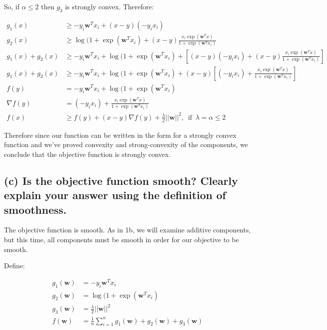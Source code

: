 \documentclass{article}
\begin{document}
So, if $\alpha \leq 2$ then $g_3$ is strongly convex.  Therefore:

\begin{equation}
\begin{aligned}
g_1(x) &\geq -y_i \mathbf{w}^T x_i + (x - y)(-y_i x_i) \\
g_2(x) &\geq \log(1 + \exp(\mathbf{w}^Tx_i) + (x - y)\frac{ x_i \exp(\mathbf{w}^Tx ) }{ 1 + \exp( \mathbf{w}^Tx_i ) } \\
g_1(x) + g_2(x) & \geq  -y_i \mathbf{w}^T x_i + \log(1 + \exp(\mathbf{w}^Tx_i) + [ (x - y)(-y_i x_i) + (x - y)\frac{ x_i \exp(\mathbf{w}^Tx ) }{ 1 + \exp( \mathbf{w}^Tx_i ) } ] \\
g_1(x) + g_2(x) & \geq  -y_i \mathbf{w}^T x_i + \log(1 + \exp(\mathbf{w}^Tx_i) + (x - y) [ (-y_i x_i) + \frac{ x_i \exp(\mathbf{w}^Tx ) }{ 1 + \exp( \mathbf{w}^Tx_i ) } ] \\
f(y) &= -y_i \mathbf{w}^T x_i + \log(1 + \exp(\mathbf{w}^Tx_i) \\
\nabla f(y) &= (-y_i x_i) + \frac{ x_i \exp(\mathbf{w}^Tx ) }{ 1 + \exp( \mathbf{w}^Tx_i ) } \\
f(x) &\geq f(y) + (x - y) \nabla f(y) + \frac\lambda2 || \mathbf{w} ||^2, \enspace \text{if} \enspace \lambda = \alpha \leq 2
\end{aligned}
\end{equation}

Therefore since our function can be written in the form for a strongly convex function and we've proved convexity and strong-convexity of the components, we conclude that the objective function is strongly convex.

\subsection{(c) Is the objective function smooth? Clearly explain your answer using the definition of smoothness.}

The objective function is smooth.  As in 1b, we will examine additive components, but this time, all components must be smooth in order for our objective to be smooth.

Define:

\begin{equation}
\begin{aligned}
g_1(\mathbf{w}) &= -y_i \mathbf{w}^T x_i \\
g_2(\mathbf{w}) &= \log(1 + \exp(\mathbf{w}^Tx_i) \\
g_3(\mathbf{w}) &= \frac\lambda2 || \mathbf{w} ||^2 \\
f(\mathbf{w}) &= \frac1n \sum\limits_{i=1}^n g_1(\mathbf{w}) + g_2(\mathbf{w}) + g_3(\mathbf{w})
\end{aligned}
\end{equation}
\end{document}
